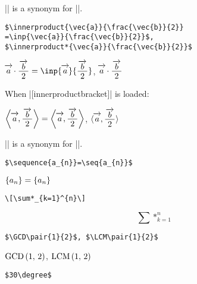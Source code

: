 \documentclass[%
fleqn,%
paper=a4paper,%
fontsize=10pt,%
open_bracket_pos=zenkakunibu_nibu,%
hanging_punctuation,%
]%
{jlreq}
\makeatletter
\DeclareRobustCommand{\linesmash}{\@ifstar{\vspace{-\baselineskip}}{\vspace{-0.25\baselineskip}}}
\makeatother
\begin{document}
\newpage
\hspace*{0.14\textwidth}|\inp| is a synonym for |\innerproduct|.
\begin{lstlisting}
$\innerproduct{\vec{a}}{\frac{\vec{b}}{2}}
=\inp{\vec{a}}{\frac{\vec{b}}{2}}$,
$\innerproduct*{\vec{a}}{\frac{\vec{b}}{2}}$
\end{lstlisting}

\begin{macroexample}
$\innerproduct{\vec{a}}{\frac{\vec{b}}{2}}
=\inp{\vec{a}}{\frac{\vec{b}}{2}}$,
$\innerproduct*{\vec{a}}{\frac{\vec{b}}{2}}$
\end{macroexample}

\linesmash\linesmash
\indent\hspace*{0.14\textwidth}When |[innerproductbracket]| is loaded:\\
\begin{macroexample}
$\left\langle \vec{a}\relax,\frac{\vec{b}}{2}\right\rangle
=\left\langle \vec{a}\relax,\frac{\vec{b}}{2}\right\rangle$,
$\langle \vec{a}\relax,\frac{\vec{b}}{2}\rangle$
\end{macroexample}

\hspace*{0.14\textwidth}|\seq| is a synonym for |\sequence|.
\begin{lstlisting}
$\sequence{a_{n}}=\seq{a_{n}}$
\end{lstlisting}

\begin{macroexample}
$\sequence{a_{n}}=\seq{a_{n}}$
\end{macroexample}

\begin{lstlisting}
\[\sum*_{k=1}^{n}\]
\end{lstlisting}

\begin{macroexample}
\linesmash\linesmash
\[\sum*_{k=1}^{n}\]
\end{macroexample}

\begin{lstlisting}
$\GCD\pair{1}{2}$, $\LCM\pair{1}{2}$
\end{lstlisting}

\begin{macroexample}
$\GCD\pair{1}{2}$, $\LCM\pair{1}{2}$
\end{macroexample}

\begin{lstlisting}
$30\degree$
\end{lstlisting}
\end{document}
